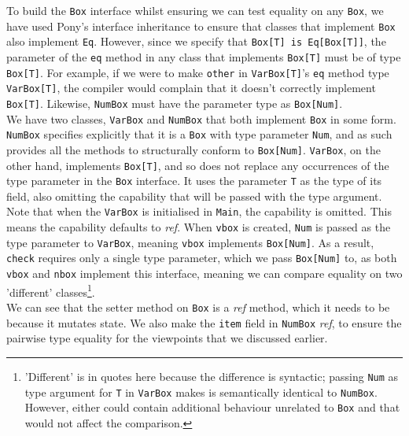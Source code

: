 To build the \texttt{Box} interface whilst ensuring we can test equality on any \texttt{Box}, we have used Pony's interface inheritance to ensure that classes that implement \texttt{Box} also implement \texttt{Eq}. However, since we specify that \texttt{Box[T] is Eq[Box[T]]}, the parameter of the \texttt{eq} method in any class that implements \texttt{Box[T]} must be of type \texttt{Box[T]}. For example, if we were to make \texttt{other} in \texttt{VarBox[T]}'s \texttt{eq} method type \texttt{VarBox[T]}, the compiler would complain that it doesn't correctly implement \texttt{Box[T]}. Likewise, \texttt{NumBox} must have the parameter type as \texttt{Box[Num]}. \\

We have two classes, \texttt{VarBox} and \texttt{NumBox}  that both implement \texttt{Box} in some form. \texttt{NumBox} specifies explicitly that it is a \texttt{Box} with type parameter \texttt{Num}, and as such provides all the methods to structurally conform to \texttt{Box[Num]}. \texttt{VarBox}, on the other hand, implements \texttt{Box[T]}, and so does not replace any occurrences of the type parameter in the \texttt{Box} interface. It uses the parameter \texttt{T} as the type of its field, also omitting the capability that will be passed with the type argument. Note that when the \texttt{VarBox} is initialised in \texttt{Main}, the capability is omitted. This means the capability defaults to \textit{ref}. When \texttt{vbox} is created, \texttt{Num} is passed as the type parameter to \texttt{VarBox}, meaning \texttt{vbox} implements \texttt{Box[Num]}. As a result, \texttt{check} requires only a single type parameter, which we pass \texttt{Box[Num]} to, as both \texttt{vbox} and \texttt{nbox} implement this interface, meaning we can compare equality on two 'different' classes\footnote{'Different' is in quotes here because the difference is syntactic; passing \texttt{Num} as type argument for \texttt{T} in \texttt{VarBox} makes is semantically identical to \texttt{NumBox}. However, either could contain additional behaviour unrelated to \texttt{Box} and that would not affect the comparison.}. \\

We can see that the setter method on \texttt{Box} is a \textit{ref} method, which it needs to be because it mutates state. We also make the \texttt{item} field in \texttt{NumBox} \textit{ref}, to ensure the pairwise type equality for the viewpoints that we discussed earlier. \\

